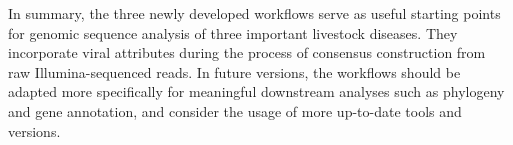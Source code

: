 In summary, the three newly developed workflows serve as useful starting points for genomic sequence analysis of three important livestock diseases. They incorporate viral attributes during the process of consensus construction from raw Illumina-sequenced reads. In future versions, the workflows should be adapted more specifically for meaningful downstream analyses such as phylogeny and gene annotation, and consider the usage of more up-to-date tools and versions.
